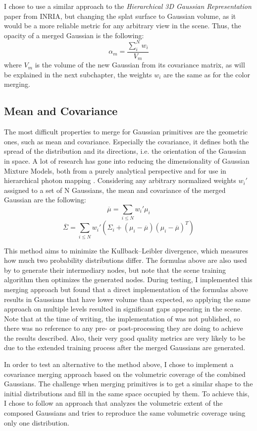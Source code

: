 I chose to use a similar approach to the \textit{Hierarchical 3D Gaussian Representation} paper from INRIA, but changing the splat surface to Gaussian volume, as it would be a more reliable metric for any arbitrary view in the scene. Thus, the opacity of a merged Gaussian is the following:
\[
\alpha_m = \frac{\sum_i^N w_i}{V_m}
\]
where $V_m$ is the volume of the new Gaussian from its covariance matrix, as will be explained in the next subchapter, the weights $w_i$ are the same as for the color merging.

\subsection{Mean and Covariance}
The most difficult properties to merge for Gaussian primitives are the geometric ones, such as mean and covariance. Especially the covariance, it defines both the spread of the distribution and its directions, i.e. the orientation of the Gaussian in space. A lot of research has gone into reducing the dimensionality of Gaussian Mixture Models, both from a purely analytical perspective \cite{gaussmerge2} and for use in hierarchical photon mapping \cite{gaussmerge1}. Considering any arbitrary normalized weights $w_i'$ assigned to a set of N Gaussians, the mean and covariance of the merged Gaussian are the following:
\[
\overline{\mu} = \sum_{i \leq N} w_i' \mu_i
\]
\[
\overline{\Sigma} = \sum_{i \leq N} w_i'(\Sigma_i + (\mu_i - \overline{\mu}) (\mu_i - \overline{\mu})^T) 
\]

This method aims to minimize the Kullback–Leibler divergence, which measures how much two probability distributions differ. The formulas above are also used by \cite{kerbl_hierarchy} to generate their intermediary nodes, but note that the scene training algorithm then optimizes the generated nodes. During testing, I implemented this merging approach but found that a direct implementation of the formulas above results in Gaussians that have lower volume than expected, so applying the same approach on multiple levels resulted in significant gaps appearing in the scene. Note that at the time of writing, the implementation of \cite{kerbl_hierarchy} was not published, so there was no reference to any pre- or post-processing they are doing to achieve the results described. Also, their very good quality metrics are very likely to be due to the extended training process after the merged Gaussians are generated.

In order to test an alternative to the method above, I chose to implement a covariance merging approach based on the volumetric coverage of the combined Gaussians. The challenge when merging primitives is to get a similar shape to the initial distributions and fill in the same space occupied by them. To achieve this, I chose to follow an approach that analyzes the volumetric extent of the composed Gaussians and tries to reproduce the same volumetric coverage using only one distribution. 

